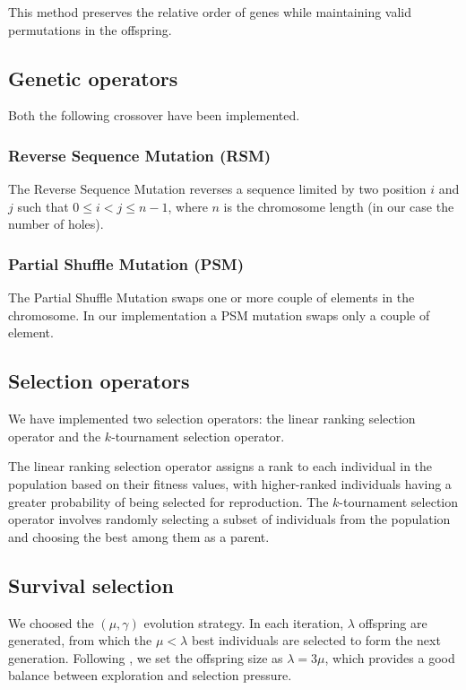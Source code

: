 \documentclass[../main.tex]{subfiles}
\begin{document}
This method preserves the relative order of genes while maintaining valid permutations in the offspring.


\subsection{Genetic operators}

Both the following crossover have been implemented.
\subsubsection{Reverse Sequence Mutation (RSM)}

The Reverse Sequence Mutation
\cite{DBLP:journals/corr/abs-1203-3099}
reverses a sequence limited by two position $i$ and $j$ such that $0 \leq i < j \leq n-1$, where $n$ is the chromosome length (in our case the number of holes). 

\subsubsection{Partial Shuffle Mutation (PSM)}
The Partial Shuffle Mutation \cite{DBLP:journals/corr/abs-1203-3099}
swaps one or more couple of elements in the chromosome. In our implementation a PSM mutation 
swaps only a couple of element.

\subsection{Selection operators}
We have implemented two selection operators: the linear ranking selection operator and the $k$-tournament selection operator.

The linear ranking selection operator assigns a rank to each individual in the population based on their fitness values, with higher-ranked individuals having a greater probability of being selected for reproduction. The $k$-tournament selection operator involves randomly selecting a subset of individuals from the population and choosing the best among them as a parent.

\subsection{Survival selection}

We choosed the $(\mu, \gamma)$ evolution strategy. In each iteration, $\lambda$ offspring are generated, from which the $\mu < \lambda$ best individuals are selected to form the next generation. Following \cite{oslobioinspired}, we set the offspring size as $\lambda = 3\mu$, which provides a good balance between exploration and selection pressure.
\end{document}
